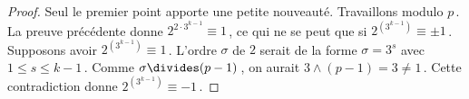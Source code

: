 \begin{proof}
	Seul le premier point apporte une petite nouveauté.
	Travaillons modulo $p$\,.
	La preuve précédente donne $2^{2 \cdot 3^{k-1}} \equiv 1$\,, ce qui ne se peut que si $2^{( 3^{k-1} )} \equiv \pm 1$\,.
	Supposons avoir $2^{( 3^{k-1} )} \equiv 1$\,.
	L'ordre $\sigma$ de $2$ serait de la forme $\sigma = 3^s$ avec $1 \leq s \leq k-1$\,.
	Comme $\sigma \divides (p-1)$\,, on aurait $3 \wedge (p-1) = 3 \neq 1$\,.
	Cette contradiction donne $2^{( 3^{k-1} )} \equiv -1$\,.
\end{proof}
